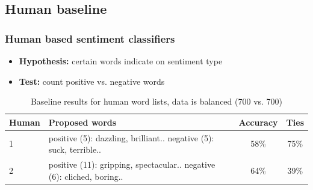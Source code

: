 \documentclass{beamer}
\begin{document}
\subsection{Human baseline}
\begin{frame}
	\frametitle{Human based sentiment classifiers}
	\begin{itemize}
		
		
		\item \textbf{Hypothesis:} certain words indicate on sentiment type
		
		\item \textbf{Test:} count positive vs. negative words
	\end{itemize}
	
	\begin{table}
		\scriptsize
		\begin{tabular}{ l | p{5cm} | c | c }
			Human & Proposed words & Accuracy & Ties \footnotemark \\ \hline \hline
			1 & positive (5): dazzling, brilliant.. \newline negative (5): suck, terrible.. & 58\% & 75\% \\ \hline
			2 & positive (11): gripping, spectacular.. \newline negative (6): cliched, boring.. & 64\% & 39\%  \\  \hline
		\end{tabular}
		\caption{Baseline results for human word lists, data is balanced (700 vs. 700)}
	\end{table}
	
	 \footnotetext{Documents percentage where sentiments rated equally}
\end{frame}
\end{document}
